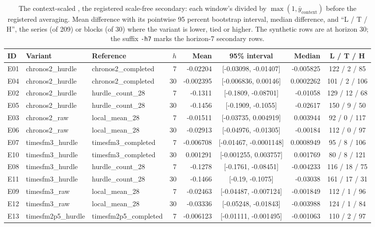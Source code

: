 \begin{table}[htbp]
\centering\footnotesize\setlength{\tabcolsep}{3.5pt}
\caption{The context-scaled \qs{}, the registered scale-free secondary: each window's \qs{} divided by
$\max(1, \bar{y}_{\text{context}})$ before the registered averaging. Mean difference with its pointwise 95
percent bootstrap interval, median difference, and ``L / T / H'', the series (of 209) or blocks (of 30)
where the variant is lower, tied or higher. The synthetic rows are at horizon 30; the suffix \texttt{-h7}
marks the horizon-7 secondary rows.}
\label{tab:s2scaled}
\begin{tabular}{lllrrcrc}
\toprule
ID & Variant & Reference & $h$ & Mean & 95\% interval & Median & L / T / H \\
\midrule
E01 & chronos2\_hurdle & chronos2\_completed & 7 & -0.02204 & [-0.03098, -0.01407] & -0.005825 & 122 / 2 / 85 \\
E04 & chronos2\_hurdle & chronos2\_completed & 30 & -0.002395 & [-0.006836, 0.00146] & 0.0002262 & 101 / 2 / 106 \\
E02 & chronos2\_hurdle & hurdle\_count\_28 & 7 & -0.1311 & [-0.1809, -0.08701] & -0.01058 & 129 / 12 / 68 \\
E05 & chronos2\_hurdle & hurdle\_count\_28 & 30 & -0.1456 & [-0.1909, -0.1055] & -0.02617 & 150 / 9 / 50 \\
E03 & chronos2\_raw & local\_mean\_28 & 7 & -0.01511 & [-0.03735, 0.004919] & 0.003944 & 92 / 0 / 117 \\
E06 & chronos2\_raw & local\_mean\_28 & 30 & -0.02913 & [-0.04976, -0.01305] & -0.00184 & 112 / 0 / 97 \\
E07 & timesfm3\_hurdle & timesfm3\_completed & 7 & -0.006708 & [-0.01467, -0.0001148] & 0.0008949 & 95 / 8 / 106 \\
E10 & timesfm3\_hurdle & timesfm3\_completed & 30 & 0.001291 & [-0.001255, 0.003757] & 0.001769 & 80 / 8 / 121 \\
E08 & timesfm3\_hurdle & hurdle\_count\_28 & 7 & -0.1278 & [-0.1761, -0.08451] & -0.004233 & 116 / 18 / 75 \\
E11 & timesfm3\_hurdle & hurdle\_count\_28 & 30 & -0.1466 & [-0.19, -0.1075] & -0.03038 & 161 / 17 / 31 \\
E09 & timesfm3\_raw & local\_mean\_28 & 7 & -0.02463 & [-0.04487, -0.007124] & -0.001849 & 112 / 1 / 96 \\
E12 & timesfm3\_raw & local\_mean\_28 & 30 & -0.03336 & [-0.05248, -0.01843] & -0.003988 & 124 / 1 / 84 \\
E13 & timesfm2p5\_hurdle & timesfm2p5\_completed & 7 & -0.006123 & [-0.01111, -0.001495] & -0.001063 & 110 / 2 / 97 \\

\end{tabular}
\end{table}
